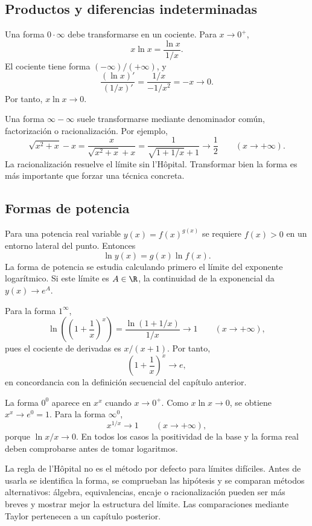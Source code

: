 \subsection{Productos y diferencias indeterminadas}

Una forma \(0\cdot\infty\) debe transformarse en un cociente. Para
\(x\to0^+\),
\[
  x\ln x=\frac{\ln x}{1/x}.
\]
El cociente tiene forma \((-\infty)/(+\infty)\), y
\[
  \frac{(\ln x)'}{(1/x)'}
  =\frac{1/x}{-1/x^2}=-x\longrightarrow0.
\]
Por tanto, \(x\ln x\to0\).

Una forma \(\infty-\infty\) suele transformarse mediante denominador común,
factorización o racionalización. Por ejemplo,
\[
 \sqrt{x^2+x}-x
 =\frac{x}{\sqrt{x^2+x}+x}
 =\frac1{\sqrt{1+1/x}+1}
 \longrightarrow\frac12
 \qquad(x\to+\infty).
\]
La racionalización resuelve el límite sin l'Hôpital. Transformar bien la forma
es más importante que forzar una técnica concreta.

\subsection{Formas de potencia}

Para una potencia real variable \(y(x)=f(x)^{g(x)}\) se requiere
\(f(x)>0\) en un entorno lateral del punto. Entonces
\[
  \ln y(x)=g(x)\ln f(x).
\]
La forma de potencia se estudia calculando primero el límite del exponente
logarítmico. Si este límite es \(A\in\R\), la continuidad de la exponencial da
\(y(x)\to e^A\).

Para la forma \(1^\infty\),
\[
 \ln\left(\left(1+\frac1x\right)^x\right)
 =\frac{\ln(1+1/x)}{1/x}
 \longrightarrow1
 \qquad(x\to+\infty),
\]
pues el cociente de derivadas es \(x/(x+1)\). Por tanto,
\[
  \left(1+\frac1x\right)^x\longrightarrow e,
\]
en concordancia con la definición secuencial del capítulo anterior.

La forma \(0^0\) aparece en \(x^x\) cuando \(x\to0^+\). Como
\(x\ln x\to0\), se obtiene \(x^x\to e^0=1\). Para la forma
\(\infty^0\),
\[
  x^{1/x}\longrightarrow1
  \qquad(x\to+\infty),
\]
porque \(\ln x/x\to0\). En todos los casos la positividad de la base y la
forma real deben comprobarse antes de tomar logaritmos.

\begin{advertencia}
La regla de l'Hôpital no es el método por defecto para límites difíciles. Antes
de usarla se identifica la forma, se comprueban las hipótesis y se comparan
métodos alternativos: álgebra, equivalencias, encaje o racionalización pueden
ser más breves y mostrar mejor la estructura del límite. Las comparaciones
mediante Taylor pertenecen a un capítulo posterior.
\end{advertencia}
